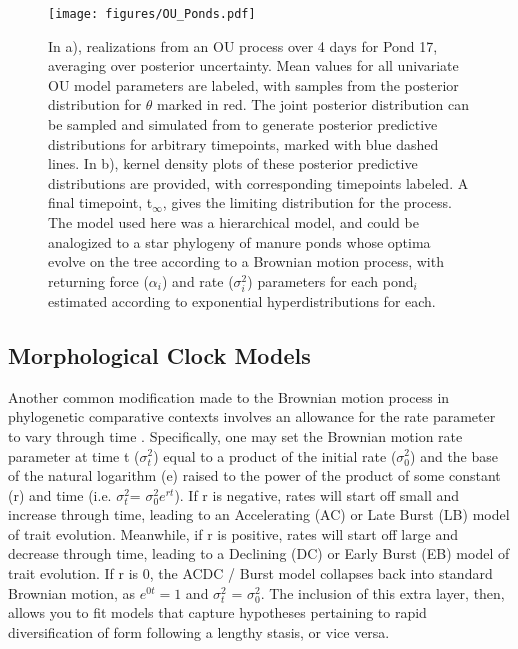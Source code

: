 \begin{figure}[h]
\centering
\texttt{[image: figures/OU\_Ponds.pdf]}
\caption[Posterior Predictive Distribution of a Hierarchical OU Model]{In a), realizations from an OU process over 4 days for Pond 17, averaging over posterior uncertainty. Mean values for all univariate OU model parameters are labeled, with samples from the posterior distribution for $\theta$ marked in red. The joint posterior distribution can be sampled and simulated from to generate posterior predictive distributions for arbitrary timepoints, marked with blue dashed lines. In b), kernel density plots of these posterior predictive distributions are provided, with corresponding timepoints labeled. A final timepoint, t$_\infty$, gives the limiting distribution for the process. The model used here was a hierarchical model, and could be analogized to a star phylogeny of manure ponds whose optima evolve on the tree according to a Brownian motion process, with returning force ($\alpha_i$) and rate ($\sigma^2_i$) parameters for each pond$_i$ estimated according to exponential hyperdistributions for each. \label{overflow}
\label{fig:OUPonds}}
\end{figure} 

\subsection{Morphological Clock Models}
 
Another common modification made to the Brownian motion process in phylogenetic comparative contexts involves an allowance for the rate parameter to vary through time \citep{blombergTestingPhylogeneticSignal2003, harmonEarlyBurstsBody2010}. Specifically, one may set the Brownian motion rate parameter at time t ($\sigma^2_t$) equal to a product of the initial rate ($\sigma^2_0$) and the base of the natural logarithm (e) raised to the power of the product of some constant (r) and time (i.e. $\sigma^2_t$= $\sigma^2_0 e^{rt}$). If r is negative, rates will start off small and increase through time, leading to an Accelerating (AC) or Late Burst (LB) model of trait evolution. Meanwhile, if r is positive, rates will start off large and decrease through time, leading to a Declining (DC) or Early Burst (EB) model of trait evolution. If r is 0, the ACDC / Burst model collapses back into standard Brownian motion, as $e^{0t} = 1$ and $\sigma^2_t$ = $\sigma^2_0$. The inclusion of this extra layer, then, allows you to fit models that capture hypotheses pertaining to rapid diversification of form following a lengthy stasis, or vice versa. 

